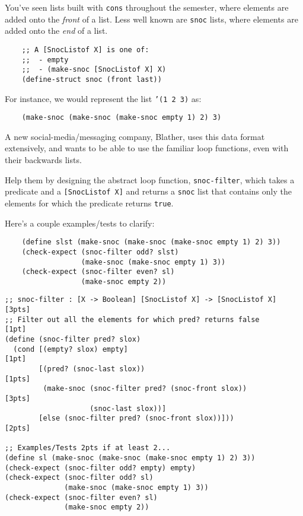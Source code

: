 \documentclass[12pt]{article}                   %
\def\pts#1{\marginpar{\footnotesize \raggedright  \fbox{#1 {\sc Points}}}}
\newenvironment{solution}{}{}
\newcommand\code[1]{\texttt{#1}}
\begin{document}
\ifrubric\bigskip\else
\newpage
\fi

\begin{problem} \pts{13}
You've seen lists built with \code{cons} throughout the semester,
where elements are added onto the \textit{front} of a list.  Less well
known are \code{snoc} lists, where elements are added onto the
\emph{end} of a list.

\begin{verbatim}
    ;; A [SnocListof X] is one of:
    ;;  - empty
    ;;  - (make-snoc [SnocListof X] X)
    (define-struct snoc (front last))
\end{verbatim}

\noindent For instance, we would represent the list \texttt{'(1 2 3)}
as:

\begin{verbatim}
    (make-snoc (make-snoc (make-snoc empty 1) 2) 3)
\end{verbatim}


\noindent A new social-media/messaging company, Blather,
uses this data format
extensively, and wants to be able to use the familiar loop functions,
even with their backwards lists.

Help them by designing the abstract loop function,
\texttt{snoc-filter}, which takes a predicate and a
\texttt{[SnocListof X]} and returns a \code{snoc} list that contains
only the elements for which the predicate returns \texttt{true}.

\bigskip

\noindent Here's a couple examples/tests to clarify:
\begin{verbatim}
    (define slst (make-snoc (make-snoc (make-snoc empty 1) 2) 3))
    (check-expect (snoc-filter odd? slst)
                  (make-snoc (make-snoc empty 1) 3))
    (check-expect (snoc-filter even? sl)
                  (make-snoc empty 2))
\end{verbatim}



\begin{solution}
\begin{verbatim}
;; snoc-filter : [X -> Boolean] [SnocListof X] -> [SnocListof X]  [3pts]
;; Filter out all the elements for which pred? returns false      [1pt]
(define (snoc-filter pred? slox)
  (cond [(empty? slox) empty]                                     [1pt]
        [(pred? (snoc-last slox))                                 [1pts]
         (make-snoc (snoc-filter pred? (snoc-front slox))         [3pts]
                    (snoc-last slox))]
        [else (snoc-filter pred? (snoc-front slox))]))            [2pts]

;; Examples/Tests 2pts if at least 2...
(define sl (make-snoc (make-snoc (make-snoc empty 1) 2) 3))
(check-expect (snoc-filter odd? empty) empty)
(check-expect (snoc-filter odd? sl)
              (make-snoc (make-snoc empty 1) 3))
(check-expect (snoc-filter even? sl)
              (make-snoc empty 2))
\end{verbatim}
\end{solution}
\end{problem}
\end{document}
